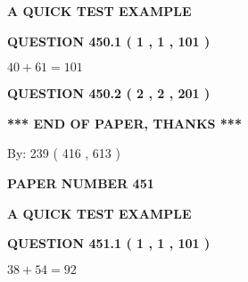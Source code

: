 \documentclass[12pt]{article}
\begin{document}
   
   
   
 \vspace{0.2in}
{\LARGE {\textbf{ A QUICK TEST EXAMPLE}}}
   
   
  
\vspace{0.2in}
  
{\textbf{\Large{QUESTION
450.1 
 ( 1 , 1 , 101 )
}}}
  
  
 
 

$ %
40 +  %
61=   %
101$
 
 
  
\vspace{0.2in}
  
{\textbf{\Large{QUESTION
450.2 
 ( 2 , 2 , 201 )
}}}
  
  
   
   
 \vspace{0.2in}
 
   
   
   
   
\vspace{1.0in} 
{\textbf{\large{ *** END OF PAPER, THANKS *** }}} 
   
   
\hspace{1.0in} By: 
 239 ( 416 ,  613 )
   
   
   
   
\newpage 
\setcounter{page}{ 
   451001 } 
   
   
   
   
 {\textbf{ \Large{ PAPER NUMBER  451  }}}
   
   
\vspace{0.2in}
   
   
   
   
   
   
 \vspace{0.2in}
{\LARGE {\textbf{ A QUICK TEST EXAMPLE}}}
   
   
  
\vspace{0.2in}
  
{\textbf{\Large{QUESTION
451.1 
 ( 1 , 1 , 101 )
}}}
  
  
 
 

$ %
38 +  %
54=   %
92$
 
 
  
\vspace{0.2in}
  
\end{document}
